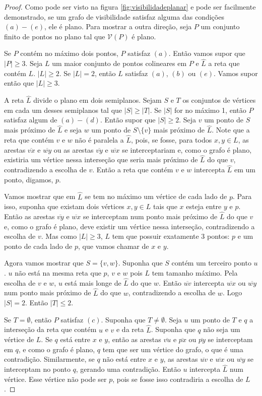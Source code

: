 \begin{proof}
    Como pode ser visto na figura \ref{fig:visibilidadeplanar} e pode ser facilmente demonstrado, se um grafo de visibilidade satisfaz alguma das condições $(a)-(e)$, ele é plano. Para mostrar a outra direção, seja $P$ um conjunto finito de pontos no plano tal que $\mathcal V(P)$ é plano.

    Se $P$ contém no máximo dois pontos, $P$ satisfaz $(a)$. Então vamos supor que $|P|\geq 3$. Seja $L$ um maior conjunto de pontos colineares em $P$ e $\hat L$ a reta que contém $L$. $|L|\geq 2$. Se $|L|=2$, então $L$ satisfaz $(a)$, $(b)$ ou $(e)$. Vamos supor então que $|L|\geq3$.

    A reta $\hat L$ divide o plano em dois semiplanos. Sejam $S$ e $T$ os conjuntos de vértices em cada um desses semiplanos tal que $|S|\geq|T|$. Se $|S|$ for no máximo 1, então $P$ satisfaz algum de $(a)-(d)$. Então supor que $|S|\geq2$. Seja $v$ um ponto de $S$ mais próximo de $\hat L$ e seja $w$ um ponto de $S\setminus\{v\}$ mais próximo de $\hat L$. Note que a reta que contém $v$ e $w$ não é paralela a $\hat L$, pois, se fosse, para todos $x,y\in L$, as arestas $\overline{vx}$ e $\overline{wy}$ ou as arestas $\overline{vy}$ e $\overline{wx}$ se interceptariam e, como o grafo é plano, existiria um vértice nessa interseção que seria mais próximo de $\hat L$ do que $v$, contradizendo a escolha de $v$. Então a reta que contém $v$ e $w$ intercepta $\hat L$ em um ponto, digamos, $p$.

    Vamos mostrar que em $\hat L$ se tem no máximo um vértice de cada lado de $p$. Para isso, suponha que existam dois vértices $x,y\in L$ tais que $x$ esteja entre $y$ e $p$. Então as arestas $\overline{vy}$ e $\overline{wx}$ se interceptam num ponto mais próximo de $\hat L$ do que $v$ e, como o grafo é plano, deve existir um vértice nessa interseção, contradizendo a escolha de $v$. Mas como $|L|\geq3$, $L$ tem que possuir exatamente $3$ pontos: $p$ e um ponto de cada lado de $p$, que vamos chamar de $x$ e $y$.

    Agora vamos mostrar que $S=\{v,w\}$. Suponha que $S$ contém um terceiro ponto $u$. $u$ não está na mesma reta que $p$, $v$ e $w$ pois $L$ tem tamanho máximo. Pela escolha de $v$ e $w$, $u$ está mais longe de $\hat L$ do que $w$. Então $\overline{uv}$ intercepta $\overline{wx}$ ou $\overline{wy}$ num ponto mais próximo de $\hat L$ do que $w$, contradizendo a escolha de $w$. Logo $|S|=2$. Então $|T|\leq2$.

    Se $T=\emptyset$, então $P$ satisfaz $(c)$. Suponha que $T\neq\emptyset$. Seja $u$ um ponto de $T$ e $q$ a interseção da reta que contém $u$ e $v$ e da reta $\hat L$. Suponha que $q$ não seja um vértice de $L$. Se $q$ está entre $x$ e $y$, então as arestas $\overline{vu}$ e $\overline{px}$ ou $\overline{py}$ se interceptam em $q$, e como o grafo é plano, $q$ tem que ser um vértice do grafo, o que é uma contradição. Similarmente, se $q$ não está entre $x$ e $y$, as arestas $\overline{uv}$ e $\overline{wx}$ ou $\overline{wy}$ se interceptam no ponto $q$, gerando uma contradição. Então $u$ intercepta $\hat L$ num vértice. Esse vértice não pode ser $p$, pois se fosse isso contradiria a escolha de $L$.


\end{proof}
